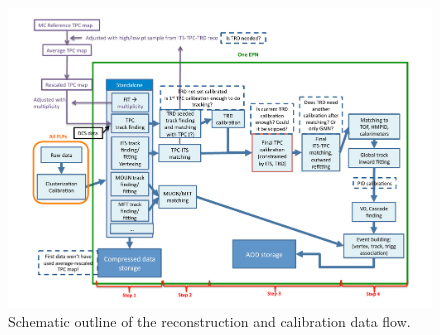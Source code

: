 \begin{figure}[htp!]
  \begin{center}
    \includegraphics[height=0.67\textheight, angle =90]{general/flow_scenarios.pdf}
    \caption{Schematic
      outline of the reconstruction and calibration data flow.}
    \label{fig:Flow}
  \end{center}
\end{figure}

